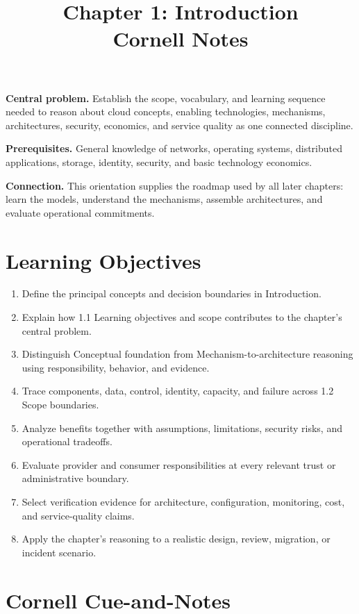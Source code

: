 \documentclass[11pt]{article}
\title{Chapter 1: Introduction\\[2mm]\large Cornell Notes}
\author{}
\date{}
\begin{document}
\maketitle
\thispagestyle{fancy}
\vspace{-1.5em}
\begin{orientationbox}
\textbf{Central problem.} Establish the scope, vocabulary, and learning sequence needed to reason about cloud concepts, enabling technologies, mechanisms, architectures, security, economics, and service quality as one connected discipline.\par\smallskip
\textbf{Prerequisites.} General knowledge of networks, operating systems, distributed applications, storage, identity, security, and basic technology economics.\par\smallskip
\textbf{Connection.} This orientation supplies the roadmap used by all later chapters: learn the models, understand the mechanisms, assemble architectures, and evaluate operational commitments.
\end{orientationbox}
\section{Learning Objectives}
\begin{enumerate}
\item Define the principal concepts and decision boundaries in Introduction.
\item Explain how 1.1 Learning objectives and scope contributes to the chapter's central problem.
\item Distinguish Conceptual foundation from Mechanism-to-architecture reasoning using responsibility, behavior, and evidence.
\item Trace components, data, control, identity, capacity, and failure across 1.2 Scope boundaries.
\item Analyze benefits together with assumptions, limitations, security risks, and operational tradeoffs.
\item Evaluate provider and consumer responsibilities at every relevant trust or administrative boundary.
\item Select verification evidence for architecture, configuration, monitoring, cost, and service-quality claims.
\item Apply the chapter's reasoning to a realistic design, review, migration, or incident scenario.
\end{enumerate}
\section{Cornell Cue-and-Notes}
\end{document}
